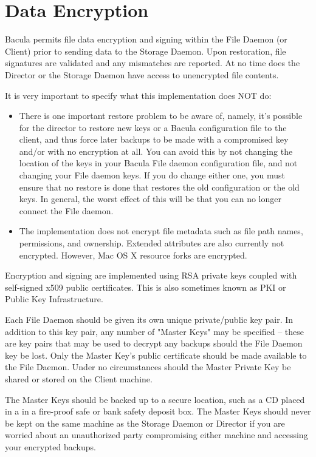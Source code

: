 
\chapter{Data Encryption}
\label{DataEncryption}

Bacula permits file data encryption and signing within the File Daemon (or
Client) prior to sending data to the Storage Daemon.  Upon restoration,
file signatures are validated and any mismatches are reported.  At no time
does the Director or the Storage Daemon have access to unencrypted file
contents.


It is very important to specify what this implementation does NOT
do:
\begin{itemize}
\item There is one important restore problem to be aware of, namely, it's
  possible for the director to restore new keys or a Bacula configuration
  file to the client, and thus force later backups to be made with a
  compromised key and/or with no encryption at all.  You can avoid this by
  not changing the location of the keys in your Bacula File daemon
  configuration file, and not changing your File daemon keys.  If you do
  change either one, you must ensure that no restore is done that restores
  the old configuration or the old keys.  In general, the worst effect of
  this will be that you can no longer connect the File daemon.

\item The implementation does not encrypt file metadata such as file path
  names, permissions, and ownership. Extended attributes are also currently
  not encrypted. However, Mac OS X resource forks are encrypted.
\end{itemize}

Encryption and signing are implemented using RSA private keys coupled with
self-signed x509 public certificates. This is also sometimes known as PKI
or Public Key Infrastructure. 

Each File Daemon should be given its own unique private/public key pair.
In addition to this key pair, any number of "Master Keys" may be specified
-- these are key pairs that may be used to decrypt any backups should the
File Daemon key be lost.  Only the Master Key's public certificate should
be made available to the File Daemon.  Under no circumstances should the
Master Private Key be shared or stored on the Client machine.

The Master Keys should be backed up to a secure location, such as a CD
placed in a in a fire-proof safe or bank safety deposit box. The Master
Keys should never be kept on the same machine as the Storage Daemon or
Director if you are worried about an unauthorized party compromising either
machine and accessing your encrypted backups.

